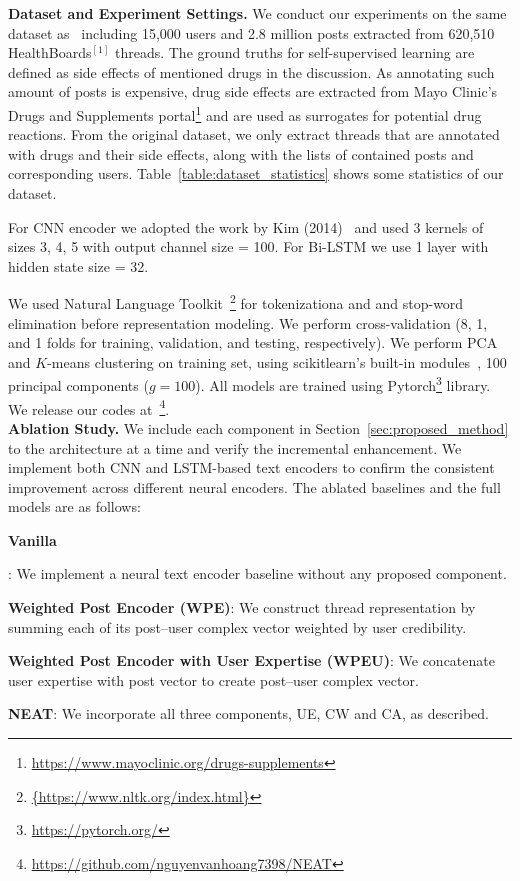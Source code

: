 \documentclass{bmcart}
\begin{document}
{\bf Dataset and Experiment Settings.} We conduct our experiments on the same dataset as~\cite{mukherjee2014people} including 15,000 users and 2.8 million posts extracted from 620,510 HealthBoards$^{[1]}$ threads. The ground truths for self-supervised learning are defined as side effects of mentioned drugs in the discussion. As annotating such amount of posts is expensive, drug side effects are extracted from Mayo Clinic's Drugs and Supplements portal\footnote{\scriptsize{\url{https://www.mayoclinic.org/drugs-supplements}}} and are used as surrogates for potential drug reactions. From the original dataset, we only extract threads that are annotated with drugs and their side effects, along with the lists of contained posts and corresponding users. Table~\ref{table:dataset_statistics} shows 
some statistics of our dataset. 

For CNN encoder we adopted the work by Kim (2014)~\cite{kim2014convolutional} and used 3 kernels of sizes 3, 4, 5 with output channel size = 100. For Bi-LSTM we use 1 layer with hidden state size = 32.

We used Natural Language Toolkit~\footnote{\scriptsize{\url{{https://www.nltk.org/index.html}}}} for tokenizationa and and stop-word elimination before representation modeling. 
We perform cross-validation (8, 1, and 1 folds for training, validation, and testing, respectively). We perform PCA and $K$-means clustering on training set, using scikitlearn's built-in modules~\cite{scikit-learn}, 
100 principal components ($g=100$). All models are trained using Pytorch\footnote{\scriptsize{\url{https://pytorch.org/}}} library. We release our codes at~\footnote{\scriptsize{\url{https://github.com/nguyenvanhoang7398/NEAT}}}. \\

{\bf Ablation Study.} We include each component in Section~\ref{sec:proposed_method} to the architecture at a time and verify the incremental enhancement. We implement both CNN and LSTM-based text encoders to confirm the consistent improvement across different neural encoders. The ablated baselines and the full models are as follows: 

\begin{itemize}
  {\item{\textbf{Vanilla}}}: We implement a neural text encoder baseline without any proposed component.
  
\item{\textbf{Weighted Post Encoder (WPE)}}: We construct thread representation by summing each of its post--user complex vector weighted by user credibility.

\item{\textbf{Weighted Post Encoder with User Expertise (WPEU)}}: We concatenate user expertise with post vector to create post--user complex vector.

\item{\textbf{NEAT}}: We incorporate all three components, UE, CW and CA, as described.

\end{itemize}
\end{document}
